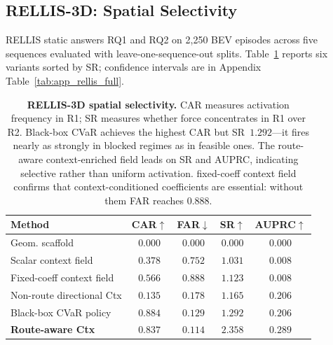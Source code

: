 \subsection{RELLIS-3D: Spatial Selectivity}
\label{sec:exp_rellis_static}

RELLIS static answers RQ1 and RQ2 on 2{,}250 BEV episodes across five
sequences evaluated with leave-one-sequence-out splits.
Table~\ref{tab:rellis_selectivity} reports six variants sorted by SR;
confidence intervals are in Appendix Table~\ref{tab:app_rellis_full}.

\begin{table}[t]
\centering
\caption{\textbf{RELLIS-3D spatial selectivity.}
CAR measures activation frequency in R1; SR measures whether force
concentrates in R1 over R2.
Black-box CVaR achieves the highest CAR but SR~$1.292$---it fires
nearly as strongly in blocked regimes as in feasible ones.
The route-aware context-enriched field leads on SR and AUPRC, indicating selective rather
than uniform activation.
fixed-coeff context field confirms that context-conditioned coefficients
are essential: without them FAR reaches $0.888$.}
\label{tab:rellis_selectivity}
\small
\setlength{\tabcolsep}{5pt}
\renewcommand{\arraystretch}{1.1}
\begin{tabular}{lcccc}
\toprule
Method & CAR$\uparrow$ & FAR$\downarrow$ & SR$\uparrow$ & AUPRC$\uparrow$ \\
\midrule
Geom. scaffold          & $0.000$ & $0.000$ & $0.000$ & $0.000$ \\
Scalar context field            & $0.378$ & $0.752$ & $1.031$ & $0.008$ \\
Fixed-coeff context field    & $0.566$ & $0.888$ & $1.123$ & $0.008$ \\
Non-route directional Ctx  & $0.135$ & $0.178$ & $1.165$ & $0.206$ \\
Black-box CVaR policy     & $0.884$ & $0.129$ & $1.292$ & $0.206$ \\
\textbf{Route-aware Ctx} & $\mathbf{0.837}$ & $\mathbf{0.114}$
                           & $\mathbf{2.358}$ & $\mathbf{0.289}$ \\
\bottomrule
\end{tabular}
\end{table}


